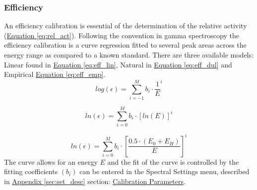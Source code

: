 \documentclass[12pt,report,justified]{SANDreport}
\begin{document}
\subsubsection{Efficiency} \label{sec:eff}
An efficiency calibration is essential of the determination of the relative activity (\hyperref[eq:rel_act]{Equation \ref{eq:rel_act}}).
Following the convention in gamma spectroscopy the efficiency calibration is a curve regression
fitted to several peak areas across the energy range as compared to a known standard. There
are three available models: Linear found in \hyperref[eq:eff_lin]{Equation \ref{eq:eff_lin}}, Natural in \hyperref[eq:eff_dul]{Equation \ref{eq:eff_dul}} and Empirical
\hyperref[eq:eff_emp]{Equation \ref{eq:eff_emp}}.
\begin{equation}
log\left( \epsilon \right) = \sum_{i=-1}^M b_i \cdot \frac{1}{E}^i
\label{eq:eff_lin}
\end{equation}

\begin{equation}
ln \left( \epsilon \right) = \sum_{i=0}^M b_i \cdot \left[ ln\left(E\right)\right]^i
\label{eq:eff_dul}
\end{equation}

\begin{equation}
ln\left(\epsilon \right) = \sum_{i=0}^M b_i \cdot \left[ \frac{0.5 \cdot \left( E_0 + E_H\right)}{E} \right]^i
\label{eq:eff_emp}
\end{equation}
The curve allows for an energy \(E\) and the fit of the curve is controlled by the fitting coefficients
\(\left(b_i\right)\) can be entered in the Spectral Settings menu, described in \hyperref[sec:set_desc]{Appendix \ref{sec:set_desc}} section: 
\hyperref[itm:cal_coeff]{Calibration Parameters}.
\end{document}

